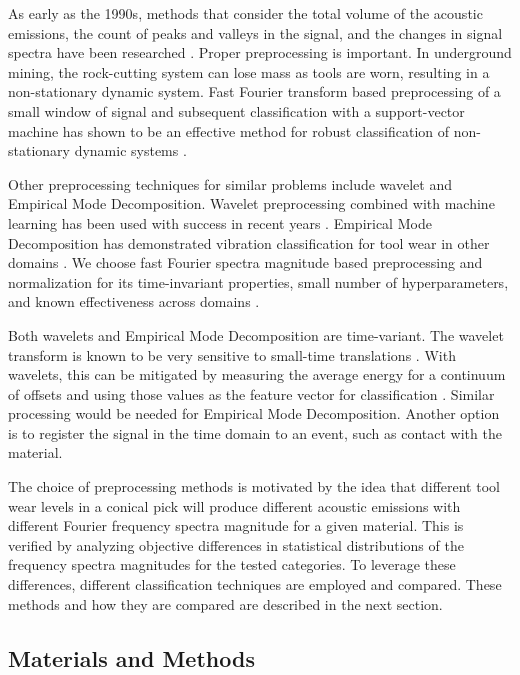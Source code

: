 As early as the 1990s, methods that consider the total volume of the acoustic emissions, 
the count of peaks and valleys in the signal, and the changes in signal spectra 
have been researched \cite{Tan1992,Kakade1995}.
Proper preprocessing is important. 
In underground mining, the rock-cutting system can lose mass as tools are worn,
resulting in a non-stationary dynamic system.
Fast Fourier transform based preprocessing of a small window of signal
 and subsequent classification with a support-vector machine has shown 
 to be an effective method for robust classification of non-stationary dynamic systems \cite{xu2016fftsvm}.

Other preprocessing techniques for similar problems include wavelet and Empirical Mode Decomposition.
Wavelet preprocessing combined with machine learning
has been used with success in recent years 
 \cite{he2013vibration, sadegh2016classification, skariah2021health}.
Empirical Mode Decomposition has demonstrated vibration classification for tool wear
 in other domains \cite{Xu2009, Nie2011, Zhan2014}.
We choose fast Fourier spectra magnitude based preprocessing and normalization for its time-invariant properties,
small number of hyperparameters, and known effectiveness across domains \cite{Xu2016, Harlianto2022}.

Both wavelets and Empirical Mode Decomposition are time-variant.
The wavelet transform is known to be very sensitive to small-time translations \cite{Yen1999}.
With wavelets, this can be mitigated by measuring the average energy for 
a continuum of offsets and using those values 
as the feature vector for classification \cite{Baccar2015}.
Similar processing would be needed for Empirical Mode Decomposition. 
Another option is to register the signal in the time domain to an event, such as contact with the material.

The choice of preprocessing methods is motivated by the idea that different tool wear levels in a conical pick 
will produce different acoustic emissions with different Fourier frequency spectra magnitude for a given material. 
This is verified by analyzing objective differences in statistical distributions of the frequency spectra magnitudes 
for the tested categories. To leverage these differences, different classification techniques are employed and compared. 
These methods and how they are compared are described in the next section.

\subsection{Materials and Methods}\label{sec2}

